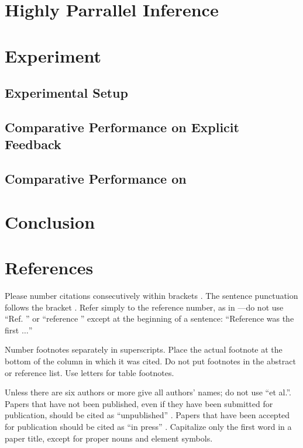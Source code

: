 \documentclass[conference]{IEEEtran}
\begin{document}
\section{Highly Parrallel Inference}\label{sec:algorithm}

\section{Experiment}\label{sec:experiment}

\subsection{Experimental Setup}

\subsection{Comparative Performance on Explicit Feedback}

\subsection{Comparative Performance on }


\section{Conclusion}\label{sec:conclusion}
\section*{References}

Please number citations consecutively within brackets \cite{b1}. The 
sentence punctuation follows the bracket \cite{b2}. Refer simply to the reference 
number, as in \cite{b3}---do not use ``Ref. \cite{b3}'' or ``reference \cite{b3}'' except at 
the beginning of a sentence: ``Reference \cite{b3} was the first $\ldots$''

Number footnotes separately in superscripts. Place the actual footnote at 
the bottom of the column in which it was cited. Do not put footnotes in the 
abstract or reference list. Use letters for table footnotes.

Unless there are six authors or more give all authors' names; do not use 
``et al.''. Papers that have not been published, even if they have been 
submitted for publication, should be cited as ``unpublished'' \cite{b4}. Papers 
that have been accepted for publication should be cited as ``in press'' \cite{b5}. 
Capitalize only the first word in a paper title, except for proper nouns and 
element symbols.
\end{document}
